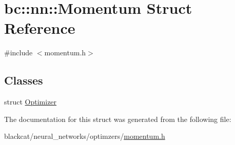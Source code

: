 \hypertarget{structbc_1_1nn_1_1Momentum}{}\section{bc\+:\+:nn\+:\+:Momentum Struct Reference}
\label{structbc_1_1nn_1_1Momentum}


{\ttfamily \#include $<$momentum.\+h$>$}

\subsection*{Classes}
\begin{DoxyCompactItemize}
\item 
struct \hyperlink{structbc_1_1nn_1_1Momentum_1_1Optimizer}{Optimizer}
\end{DoxyCompactItemize}


The documentation for this struct was generated from the following file\+:\begin{DoxyCompactItemize}
\item 
blackcat/neural\+\_\+networks/optimzers/\hyperlink{momentum_8h}{momentum.\+h}\end{DoxyCompactItemize}
